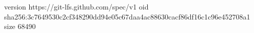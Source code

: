 version https://git-lfs.github.com/spec/v1
oid sha256:3c7649530c2cf348290dd94e05c67daa4ac88630cacf86df16c1c96e452708a1
size 68490

